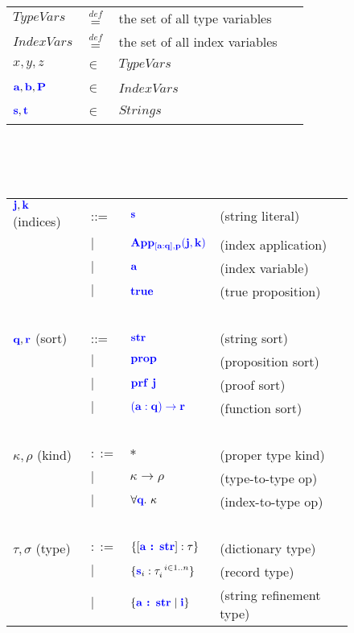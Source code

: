 \documentclass[sigplan,10pt,review,anonymous]{acmart}
\newcommand{\blu}[1]{\textbf{\color{blue}{#1}}}
\newcommand{\blum}[1]{\mathbf{\color{blue}{#1}}}
\newcommand{\defeq}{\overset{\mathit{def}}{=}}
\begin{document}
\begin{figure}
\begin{tabular}{llll}
$\mathit{TypeVars}$ & $\defeq$ & the set of all type variables \\
$\mathit{IndexVars}$ & $\defeq$ & the set of all index variables \\
$x,y,z$ & $\in$ & $\mathit{TypeVars}$ & ~ \\
$\blu{a}, \blu{b}, \blu{P}$ & $\in$ & $\mathit{IndexVars}$ & ~ \\
$\blu{s},\blu{t}$ & $\in$ & $\mathit{Strings}$ & ~ \\
\end{tabular}\\~\\~\\
\begin{tabular}{llll}
$\blu{j},\blu{k}$ (indices) & ::=  & $\blum{s}$ & (string literal) \\
                          & $\mid$ & $\blum{App}_{\blum{[a : q],p}}\blum{(j,k)}$ & (index application) \\
                          & $\mid$ & $\blu{a}$ & (index variable) \\
                          & $\mid$ & $\blu{true}$ & (true proposition) \\
~ & ~ & ~ & ~ \\
$\blu{q},\blu{r}$ (sort) & ::= & $\blum{str}$ & (string sort) \\
                         & $\mid$ & $\blum{prop}$ & (proposition sort) \\
                         & $\mid$ & $\blum{prf~j}$ & (proof sort) \\
                         & $\mid$ & $\blum{(a : q) \to r}$ & (function sort) \\
~ & ~ & ~ & ~ \\
$\kappa,\rho$ (kind) & $::=$ & $\ast$ & (proper type kind) \\
                     & $\mid$ & $\kappa \to \rho$ & (type-to-type op)\\
                     & $\mid$ & $\forall \blu{q}.~\kappa$ & (index-to-type op) \\
~ & ~ & ~ & ~ \\
$\tau,\sigma$ (type) & $::=$ & $\{[\blu{a : str}] : \tau \}$ & (dictionary type) \\ 
       & $\mid$ & $\{ \blu{s}_i : \tau_i^{~i \in 1..n} \}$ & (record type) \\
       & $\mid$ & $\{ \blu{a : str} \mid \blu{i} \}$ & (string refinement type) \\

\end{tabular}
\end{figure}
\end{document}
